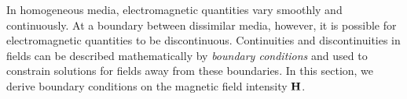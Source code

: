 

\label{m0023_Boundary_Conditions_on_H} %

In homogeneous media, electromagnetic quantities vary smoothly and continuously.
At a boundary between dissimilar media, however, it is possible for electromagnetic quantities to be discontinuous.
Continuities and discontinuities in fields can be described mathematically by \emph{boundary conditions}
and used to constrain solutions for fields away from these boundaries.
In this section, we derive boundary conditions on the magnetic field intensity ${\bf H}$.

